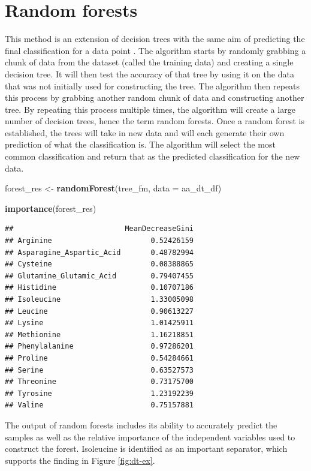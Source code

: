 \documentclass[12pt,openany]{book}
\newenvironment{Shaded}{\begin{snugshade}}{\end{snugshade}}
\newcommand{\KeywordTok}[1]{\textcolor[rgb]{0.13,0.29,0.53}{\textbf{#1}}}
\newcommand{\DataTypeTok}[1]{\textcolor[rgb]{0.13,0.29,0.53}{#1}}
\newcommand{\StringTok}[1]{\textcolor[rgb]{0.31,0.60,0.02}{#1}}
\newcommand{\NormalTok}[1]{#1}
\begin{document}
\section{Random forests}\label{random-forests}

This method is an extension of decision trees with the same aim of
predicting the final classification for a data point
\citep{breiman2001random, liaw2002classification}. The algorithm starts
by randomly grabbing a chunk of data from the dataset (called the
training data) and creating a single decision tree. It will then test
the accuracy of that tree by using it on the data that was not initially
used for constructing the tree. The algorithm then repeats this process
by grabbing another random chunk of data and constructing another tree.
By repeating this process multiple times, the algorithm will create a
large number of decision trees, hence the term random forests. Once a
random forest is established, the trees will take in new data and will
each generate their own prediction of what the classification is. The
algorithm will select the most common classification and return that as
the predicted classification for the new data.

\begin{Shaded}
\begin{Highlighting}[]
\NormalTok{forest_res <-}\StringTok{ }\KeywordTok{randomForest}\NormalTok{(tree_fm, }\DataTypeTok{data =}\NormalTok{ aa_dt_df)}

\KeywordTok{importance}\NormalTok{(forest_res)}
\end{Highlighting}
\end{Shaded}

\begin{verbatim}
##                          MeanDecreaseGini
## Arginine                       0.52426159
## Asparagine_Aspartic_Acid       0.48782994
## Cysteine                       0.08388865
## Glutamine_Glutamic_Acid        0.79407455
## Histidine                      0.10707186
## Isoleucine                     1.33005098
## Leucine                        0.90613227
## Lysine                         1.01425911
## Methionine                     1.16218851
## Phenylalanine                  0.97286201
## Proline                        0.54284661
## Serine                         0.63527573
## Threonine                      0.73175700
## Tyrosine                       1.23192239
## Valine                         0.75157881
\end{verbatim}

The output of random forests includes its ability to accurately predict
the samples as well as the relative importance of the independent
variables used to construct the forest. Isoleucine is identified as an
important separator, which supports the finding in Figure
\ref{fig:dt-ex}.
\end{document}
